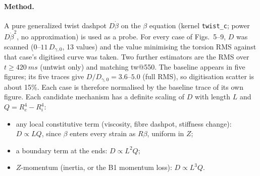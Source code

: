 \documentclass[10pt]{article}
\begin{document}
\paragraph{Method.} A pure generalized twist dashpot $D\dot\beta$ on the $\beta$ equation (kernel
\texttt{twist\_c}; power $D\dot\beta^2$, no approximation) is used as a probe. For every case of
Figs.~5--9, $D$ was scanned ($0$--$11\,D_{\gamma,0}$, 13 values) and the value minimising the
torsion RMS against that case's digitised curve was taken. Two further estimators are the RMS
over $t\ge\SI{420}{ms}$ (untwist only) and matching tw@550. The baseline appears in five figures;
its five traces give $D/D_{\gamma,0}=3.6$--$5.0$ (full RMS), so digitisation scatter is about
15\%. Each case is therefore normalised by the baseline trace of its own figure. Each candidate
mechanism has a definite scaling of $D$ with length $L$ and $Q=R_e^4-R_i^4$:
\begin{itemize}
\item any local constitutive term (viscosity, fibre dashpot, stiffness change): $D\propto LQ$, since
  $\beta$ enters every strain as $R\beta$, uniform in $Z$;
\item a boundary term at the ends: $D\propto L^2Q$;
\item $Z$-momentum (inertia, or the B1 momentum loss): $D\propto L^3Q$.
\end{itemize}
\end{document}
